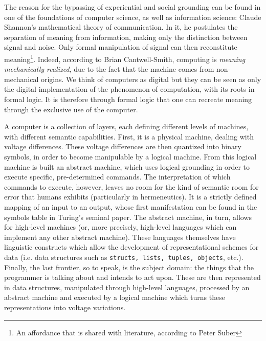 The reason for the bypassing of experiential and social grounding can be found in one of the foundations of computer science, as well as information science: Claude Shannon's mathematical theory of communication. In it, he postulates the separation of meaning from information, making only the distinction between signal and noise. Only formal manipulation of signal can then reconstitute meaning\footnote{An affordance that is shared with literature, according to Peter Suber\citep{suber_what_1988}}. Indeed, according to Brian Cantwell-Smith, computing is \emph{meaning mechanically realized}, due to the fact that the machine comes from non-mechanical origins\citep{smith_aos_2016}. We think of computers as digital but they can be seen as only the digital implementation of the phenomenon of computation, with its roots in formal logic. It is therefore through formal logic that one can recreate meaning through the exclusive use of the computer.

A computer is a collection of layers, each defining different levels of machines, with different semantic capabilities. First, it is a physical machine, dealing with voltage differences. These voltage differences are then quantized into binary symbols, in order to become manipulable by a logical machine. From this logical machine is built an abstract machine, which uses logical grounding in order to execute specific, pre-determined commands. The interpretation of which commands to execute, however, leaves no room for the kind of semantic room for error that humans exhibits (particularly in hermeneutics). It is a strictly defined mapping of an input to an output, whose first manifestation can be found in the symbols table in Turing's seminal paper. The abstract machine, in turn, allows for high-level machines (or, more precisely, high-level languages which can implement any other abstract machine). These languages themselves have linguistic constructs which allow the development of representational schemes for data (i.e. data structures such as \lstinline{structs, lists, tuples, objects}, etc.). Finally, the last frontier, so to speak, is the subject domain: the things that the programmer is talking about and intends to act upon. These are then represented in data structures, manipulated through high-level languages, processed by an abstract machine and executed by a logical machine which turns these representations into voltage variations.

